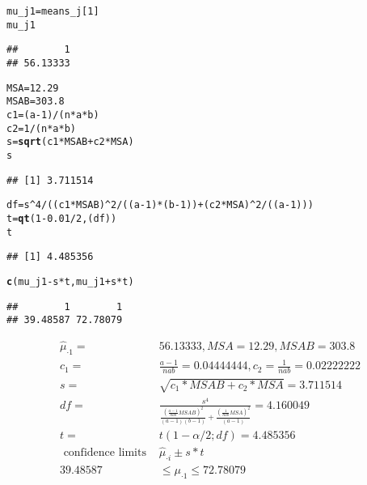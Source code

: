 \documentclass{article}\usepackage[]{graphicx}\usepackage[]{color}
\makeatletter
\newcommand{\hlnum}[1]{\textcolor[rgb]{0.686,0.059,0.569}{#1}}%
\newcommand{\hlopt}[1]{\textcolor[rgb]{0,0,0}{#1}}%
\newcommand{\hlstd}[1]{\textcolor[rgb]{0.345,0.345,0.345}{#1}}%
\newcommand{\hlkwb}[1]{\textcolor[rgb]{0.69,0.353,0.396}{#1}}%
\newcommand{\hlkwd}[1]{\textcolor[rgb]{0.737,0.353,0.396}{\textbf{#1}}}%
\newenvironment{kframe}{%
 \def\at@end@of@kframe{}%
 \ifinner\ifhmode%
  \def\at@end@of@kframe{\end{minipage}}%
  \begin{minipage}{\columnwidth}%
 \fi\fi%
 \def\FrameCommand##1{\hskip\@totalleftmargin \hskip-\fboxsep
 \colorbox{shadecolor}{##1}\hskip-\fboxsep
     \hskip-\linewidth \hskip-\@totalleftmargin \hskip\columnwidth}%
 \MakeFramed {\advance\hsize-\width
   \@totalleftmargin\z@ \linewidth\hsize
   \@setminipage}}%
 {\par\unskip\endMakeFramed%
 \at@end@of@kframe}
\newenvironment{knitrout}{}{} %
\makeatother
\begin{document}
\begin{enumerate}[(a)]
\begin{knitrout}
\color{fgcolor}\begin{kframe}
\begin{alltt}
  \hlstd{mu_j1} \hlkwb{=} \hlstd{means_j[}\hlnum{1}\hlstd{]}
  \hlstd{mu_j1}
\end{alltt}
\begin{verbatim}
##        1 
## 56.13333
\end{verbatim}
\begin{alltt}
  \hlstd{MSA} \hlkwb{=} \hlnum{12.29}
  \hlstd{MSAB} \hlkwb{=} \hlnum{303.8}
  \hlstd{c1} \hlkwb{=} \hlstd{(a}\hlopt{-}\hlnum{1}\hlstd{)}\hlopt{/}\hlstd{(n}\hlopt{*}\hlstd{a}\hlopt{*}\hlstd{b)}
  \hlstd{c2} \hlkwb{=} \hlnum{1}\hlopt{/}\hlstd{(n}\hlopt{*}\hlstd{a}\hlopt{*}\hlstd{b)}
  \hlstd{s} \hlkwb{=} \hlkwd{sqrt}\hlstd{(c1}\hlopt{*}\hlstd{MSAB}\hlopt{+}\hlstd{c2}\hlopt{*}\hlstd{MSA)}
  \hlstd{s}
\end{alltt}
\begin{verbatim}
## [1] 3.711514
\end{verbatim}
\begin{alltt}
  \hlstd{df} \hlkwb{=} \hlstd{s}\hlopt{^}\hlnum{4}\hlopt{/}\hlstd{( (c1}\hlopt{*}\hlstd{MSAB)}\hlopt{^}\hlnum{2}\hlopt{/}\hlstd{((a}\hlopt{-}\hlnum{1}\hlstd{)}\hlopt{*}\hlstd{(b}\hlopt{-}\hlnum{1}\hlstd{))}\hlopt{+} \hlstd{(c2}\hlopt{*}\hlstd{MSA)}\hlopt{^}\hlnum{2}\hlopt{/}\hlstd{((a}\hlopt{-}\hlnum{1}\hlstd{)))}
  \hlstd{t} \hlkwb{=} \hlkwd{qt}\hlstd{(}\hlnum{1}\hlopt{-}\hlnum{0.01}\hlopt{/}\hlnum{2}\hlstd{,(df))}
  \hlstd{t}
\end{alltt}
\begin{verbatim}
## [1] 4.485356
\end{verbatim}
\begin{alltt}
  \hlkwd{c}\hlstd{(mu_j1}\hlopt{-}\hlstd{s}\hlopt{*}\hlstd{t, mu_j1}\hlopt{+}\hlstd{s}\hlopt{*}\hlstd{t)}
\end{alltt}
\begin{verbatim}
##        1        1 
## 39.48587 72.78079
\end{verbatim}
\end{kframe}
\end{knitrout}

\begin{displaymath}
\begin{split}
\hat{\mu}_{\cdot 1}  =& 56.13333, MSA = 12.29 ,MSAB = 303.8 \\
c_1 =& \frac{a-1}{nab}=0.04444444 , c_2 = \frac{1}{nab} = 0.02222222\\
s = &\sqrt{c_1 *MSAB+c_2*MSA} = 3.711514\\
df = &\frac{s^4}{\frac{(\frac{a-1}{nab}MSAB)^2}{(a-1)(b-1)}+\frac{(\frac{1}{nab}MSA)^2}{(a-1)}}=4.160049\\
t = &t(1-\alpha/2;df) = 4.485356\\
\text{ confidence limits } &\hat{\mu}_{\cdot i} \pm s*t\\
39.48587 &\leq \mu_{\cdot 1} \leq 72.78079 
\end{split}
\end{displaymath}


\end{enumerate}
\end{document}
